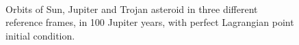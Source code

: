 \documentclass[12pt,a4paper]{article}
\begin{document}
\begin{figure}[H]
 \\
\caption{Orbits of Sun, Jupiter and Trojan asteroid in three different reference frames, in 100 Jupiter years, with perfect Lagrangian point initial condition.}  
\label{fig: figure123_100v_100orbits}
\end{figure}
\end{document}
